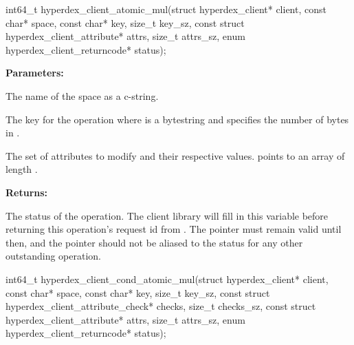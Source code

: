 \funcsep
{}
\begin{ccode}
int64_t hyperdex_client_atomic_mul(struct hyperdex_client* client,
                const char* space,
                const char* key, size_t key_sz,
                const struct hyperdex_client_attribute* attrs, size_t attrs_sz,
                enum hyperdex_client_returncode* status);
\end{ccode}
\funcdesc 

\noindent\textbf{Parameters:}
\begin{description}[labelindent=\widthof{{\code{attrs}, \code{attrs\_sz}}},leftmargin=*,noitemsep,nolistsep,align=right]
\item[\code{space}] The name of the space as a c-string.
\item[\code{key}, \code{key\_sz}] The key for the operation where  is a bytestring and  specifies the number of bytes in .
\item[\code{attrs}, \code{attrs\_sz}] The set of attributes to modify and their respective values.   points to an array of length .
\end{description}

\noindent\textbf{Returns:}
\begin{description}[labelindent=\widthof{{\code{status}}},leftmargin=*,noitemsep,nolistsep,align=right]
\item[\code{status}] The status of the operation.  The client library will fill in this variable before returning this operation's request id from .  The pointer must remain valid until then, and the pointer should not be aliased to the status for any other outstanding operation.
\end{description}

\funcsep
{}
\begin{ccode}
int64_t hyperdex_client_cond_atomic_mul(struct hyperdex_client* client,
                const char* space,
                const char* key, size_t key_sz,
                const struct hyperdex_client_attribute_check* checks, size_t checks_sz,
                const struct hyperdex_client_attribute* attrs, size_t attrs_sz,
                enum hyperdex_client_returncode* status);
\end{ccode}
\funcdesc 

